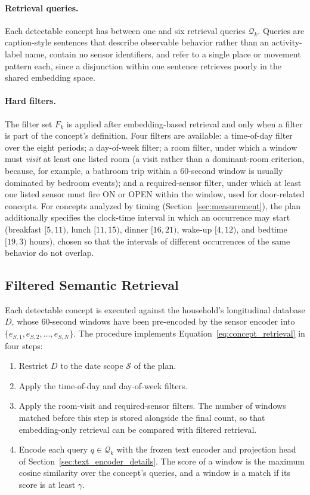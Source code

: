 \paragraph{Retrieval queries.}
Each detectable concept has between one and six retrieval queries $\mathcal{Q}_k$. Queries are caption-style sentences that describe observable behavior rather than an activity-label name, contain no sensor identifiers, and refer to a single place or movement pattern each, since a disjunction within one sentence retrieves poorly in the shared embedding space.

\paragraph{Hard filters.}
The filter set $F_k$ is applied after embedding-based retrieval and only when a filter is part of the concept's definition. Four filters are available: a time-of-day filter over the eight periods; a day-of-week filter; a room filter, under which a window must \emph{visit} at least one listed room (a visit rather than a dominant-room criterion, because, for example, a bathroom trip within a 60-second window is usually dominated by bedroom events); and a required-sensor filter, under which at least one listed sensor must fire ON or OPEN within the window, used for door-related concepts. For concepts analyzed by timing (Section~\ref{sec:measurement}), the plan additionally specifies the clock-time interval in which an occurrence may start (breakfast $[5, 11)$, lunch $[11, 15)$, dinner $[16, 21)$, wake-up $[4, 12)$, and bedtime $[19, 3)$ hours), chosen so that the intervals of different occurrences of the same behavior do not overlap.


\subsection{Filtered Semantic Retrieval}
\label{sec:retrieval_strategy}

Each detectable concept is executed against the household's longitudinal database $D$, whose 60-second windows have been pre-encoded by the sensor encoder into $\{e_{S,1}, e_{S,2}, \dots, e_{S,N}\}$. The procedure implements Equation~\ref{eq:concept_retrieval} in four steps:

\begin{enumerate}
    \item Restrict $D$ to the date scope $\mathcal{S}$ of the plan.
    \item Apply the time-of-day and day-of-week filters.
    \item Apply the room-visit and required-sensor filters. The number of windows matched before this step is stored alongside the final count, so that embedding-only retrieval can be compared with filtered retrieval.
    \item Encode each query $q \in \mathcal{Q}_k$ with the frozen text encoder and projection head of Section~\ref{sec:text_encoder_details}. The score of a window is the maximum cosine similarity over the concept's queries, and a window is a match if its score is at least $\gamma$.
\end{enumerate}


